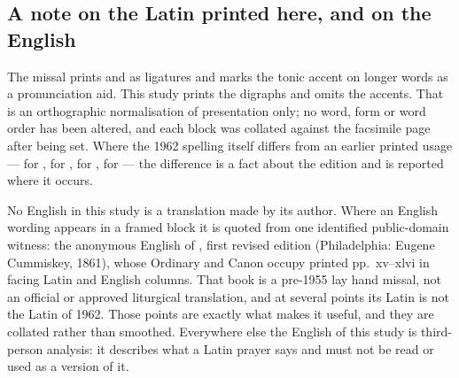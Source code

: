 \subsection*{A note on the Latin printed here, and on the English}

The missal prints  and  as ligatures and marks the
tonic accent on longer words as a pronunciation aid. This study prints the
digraphs and omits the accents. That is an orthographic normalisation of
presentation only; no word, form or word order has been altered, and each block
was collated against the facsimile page after being set. Where the 1962
spelling itself differs from an earlier printed usage --- 
for ,  for
,  for ,
 for  --- the difference is a fact
about the edition and is reported where it occurs.

No English in this study is a translation made by its author. Where an English
wording appears in a framed block it is quoted from one identified public-domain
witness: the anonymous English of , first revised edition (Philadelphia:
Eugene Cummiskey, 1861), whose Ordinary and Canon occupy printed pp.~xv--xlvi
in facing Latin and English columns. That book is a pre-1955 lay hand missal,
not an official or approved liturgical translation, and at several points its
Latin is not the Latin of 1962. Those points are exactly what makes it useful,
and they are collated rather than smoothed. Everywhere else the English of this
study is third-person analysis: it describes what a Latin prayer says and must
not be read or used as a version of it.
